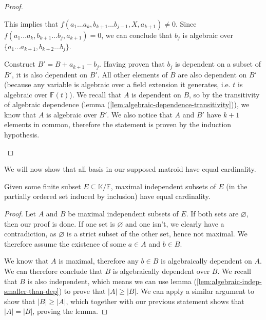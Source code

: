 \begin{proof}
\begin{enumerate}
		      This implies that $f(a _1 \ldots a _k, b _{k + 1} \ldots b _{j - 1}, X, a _{k + 1}) \neq 0$. Since $ f(a _1 \ldots a _{k}, b _{k + 1} \ldots b _{j}, a _{k + 1})  = 0$, we can conclude that $b_j$ is algebraic over $\{a _1 \ldots a _{k + 1}, b _{k + 2} \ldots b _j\}$.

		      Construct $B' = B + a _{k + 1} - b_j$. Having proven that $b_j$ is dependent on a subset of $B'$, it is also dependent on $B'$. All other elements of $B$ are also dependent on $B'$ (because any variable is algebraic over a field extension it generates, i.e. $t$ is algebraic over $\mathbb F(t)$). We recall that $A$ is dependent on $B$, so by the transitivity of algebraic dependence (lemma (\ref{lem:algebraic-dependence-transitivity})), we know that $A$ is algebraic over $B'$. We also notice that $A$ and $B'$ have $k + 1$ elements in common, therefore the statement is proven by the induction hypothesis.
	\end{enumerate}
\end{proof}

We will now show that all basis in our supposed matroid have equal cardinality.

\begin{lemma}\label{lem:algebraic-matroid-equal-size-basis}
	Given some finite subset $E \subseteq \mathbb K / \mathbb F$, maximal independent subsets of $E$ (in the partially ordered set induced by inclusion) have equal cardinality.
\end{lemma}

\begin{proof}
	Let $A$ and $B$ be maximal independent subsets of $E$. If both sets are $\varnothing$, then our proof is done. If one set is $\varnothing$ and one isn't, we clearly have a contradiction, as $\varnothing$ is a strict subset of the other set, hence not maximal. We therefore assume the existence of some $a \in A$ and $b \in B$.

	We know that $A$ is maximal, therefore any $b \in B$ is algebraically dependent on $A$. We can therefore conclude that $B$ is algebraically dependent over $B$. We recall that $B$ is also independent, which means we can use lemma (\ref{lem:algebraic-indep-smaller-than-dep}) to prove that $|A| \geq |B|$. We can apply a similar argument to show that $|B| \geq |A|$, which together with our previous statement shows that $|A| = |B|$, proving the lemma.
\end{proof}


